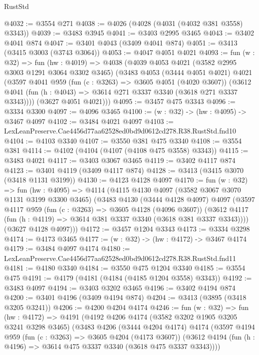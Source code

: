 \begin{lexlean}{RustStd}
\begin{coremodule}
@4032 := @3554 @271
@4038 := @4026 (@4028 (@4031 (@4032 @381 @3558) @3343))
@4039 := @3483 @3945
@4041 := @3403 @2995 @3465
@4043 := @3402 @4041 @874
@4047 := @3401 @4043 (@3409 @4041 @874)
@4051 := @3413 (@3415 @3003 (@3743 @3064))
@4053 := @4047 @4051 @4021
@4093 := fun (w : @32) =>
  fun (hw : @4019) =>
  @4038
    (@4039
      @4053
      @4021
      (@3582 @2995 @3003 @1291 @3064 @3302 @3465)
      (@3483
        @4053
        (@3444 @4051 @4021)
        @4021
        (@3597
          @4041
          @959
          (fun (c : @3263) => @3605 @4051 (@4020 @3607))
          (@3612 @4041 (fun (h : @4043) => @3614 @271 @3337 @3340 (@3618 @271 @3337 @3343))))
        (@3627 @4051 @4021)))
@4095 := @3457 @475 @3343
@4096 := @3334 @3300
@4097 := @4096 @3465
@4100 := (w : @32) -> (hw : @4095) -> @3467 @4097
@4102 := @3484 @4021 @4097
@4103 := LexLeanPreserve.Cae4456d77aa62528ed0bd9d0612cd278.R38.RustStd.fnd10
@4104 := @4103 @3340
@4107 := @3550 @381 @475 @3340
@4108 := @3554 @381
@4114 := @4102 (@4104 (@4107 (@4108 @475 @3558) @3343))
@4115 := @3483 @4021
@4117 := @3403 @3067 @3465
@4119 := @3402 @4117 @874
@4123 := @3401 @4119 (@3409 @4117 @874)
@4128 := @3413 (@3415 @3070 (@3418 @1131 @3199))
@4130 := @4123 @4128 @4097
@4170 := fun (w : @32) =>
  fun (hw : @4095) =>
  @4114
    (@4115
      @4130
      @4097
      (@3582 @3067 @3070 @1131 @3199 @3300 @3465)
      (@3483
        @4130
        (@3444 @4128 @4097)
        @4097
        (@3597
          @4117
          @959
          (fun (c : @3263) => @3605 @4128 (@4096 @3607))
          (@3612 @4117 (fun (h : @4119) => @3614 @381 @3337 @3340 (@3618 @381 @3337 @3343))))
        (@3627 @4128 @4097)))
@4172 := @3457 @1204 @3343
@4173 := @3334 @3298
@4174 := @4173 @3465
@4177 := (w : @32) -> (hw : @4172) -> @3467 @4174
@4179 := @3484 @4097 @4174
@4180 := LexLeanPreserve.Cae4456d77aa62528ed0bd9d0612cd278.R38.RustStd.fnd11
@4181 := @4180 @3340
@4184 := @3550 @475 @1204 @3340
@4185 := @3554 @475
@4191 := @4179 (@4181 (@4184 (@4185 @1204 @3558) @3343))
@4192 := @3483 @4097
@4194 := @3403 @3202 @3465
@4196 := @3402 @4194 @874
@4200 := @3401 @4196 (@3409 @4194 @874)
@4204 := @3413 (@3895 (@3418 @3205 @3241))
@4206 := @4200 @4204 @4174
@4246 := fun (w : @32) =>
  fun (hw : @4172) =>
  @4191
    (@4192
      @4206
      @4174
      (@3582 @3202 @1905 @3205 @3241 @3298 @3465)
      (@3483
        @4206
        (@3444 @4204 @4174)
        @4174
        (@3597
          @4194
          @959
          (fun (c : @3263) => @3605 @4204 (@4173 @3607))
          (@3612 @4194 (fun (h : @4196) => @3614 @475 @3337 @3340 (@3618 @475 @3337 @3343))))

\end{coremodule}
\end{lexlean}

